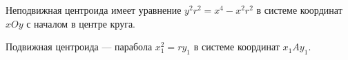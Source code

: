 Неподвижная центроида имеет уравнение $y^2r^2 = x^4 - x^2r^2$
в системе координат $xOy$ с началом в центре круга.

Подвижная центроида --- парабола $x^2_1 = ry_1$ в системе координат $x_1Ay_1$.
